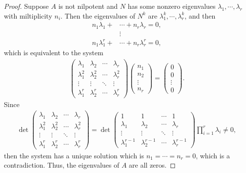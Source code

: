 \documentclass[11pt]{book}
\theoremstyle{definition}
\numberwithin{equation}{chapter}
\begin{document}
\begin{subappendices}
\begin{proof}
Suppose $A$ is not nilpotent and $N$ has some nonzero eigenvalues $\lambda_1, \cdots, \lambda_r$ with miltiplicity $n_i$. Then the eigenvalues of $N^k$ are $\lambda_1^k, \cdots, \lambda_r^k$, and then
\begin{align*}
    n_1 \lambda_1 + & \cdots + n_r \lambda_r = 0, \\
    & \vdots \\
    n_1 \lambda_1^r + & \cdots + n_r \lambda_r^r = 0,
\end{align*}
which is equivalent to the system
\begin{align*}
    \begin{pmatrix}
        \lambda_1 & \lambda_2 & \cdots & \lambda_r \\
        \lambda_1^2 & \lambda_2^2 & \cdots & \lambda_r^2 \\
        \vdots & \vdots & \ddots & \vdots \\
        \lambda_1^r & \lambda_2^r & \cdots & \lambda_r^r
    \end{pmatrix} 
    \begin{pmatrix}
        n_1 \\
        n_2 \\
        \vdots \\
        n_r
    \end{pmatrix} = \begin{pmatrix}
        0 \\
        0 \\
        \vdots \\
        0
    \end{pmatrix}.
\end{align*}
Since 
\begin{align*}
    \det \begin{pmatrix}
        \lambda_1 & \lambda_2 & \cdots & \lambda_r \\
        \lambda_1^2 & \lambda_2^2 & \cdots & \lambda_r^2 \\
        \vdots & \vdots & \ddots & \vdots \\
        \lambda_1^r & \lambda_2^r & \cdots & \lambda_r^r
    \end{pmatrix} = \det \begin{pmatrix}
        1 & 1 & \cdots & 1 \\
        \lambda_1 & \lambda_2 & \cdots & \lambda_r \\
        \vdots & \vdots & \ddots & \vdots \\
        \lambda_1^{r-1} & \lambda_2^{r-1} & \cdots & \lambda_r^{r-1}
    \end{pmatrix} \prod^r_{i=1} \lambda_i \neq 0,
\end{align*}
then the system has a unique solution which is $n_1 = \cdots = n_r = 0$, which is a contradiction\cite{31}. Thus, the eigenvalues of $A$ are all zeros.
\end{proof}


\end{subappendices}
\end{document}

